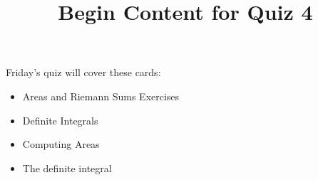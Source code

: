 \documentclass{ximera}
\title{Begin Content for Quiz 4}
\begin{document}
\begin{abstract}
\end{abstract}

\maketitle

\begin{sectionOutcomes}

Friday's quiz will cover these cards:





\begin{itemize}
\item Areas and Riemann Sums Exercises
\item Definite Integrals
\item Computing Areas
\item The definite integral
\end{itemize}


\end{sectionOutcomes}
\end{document}
